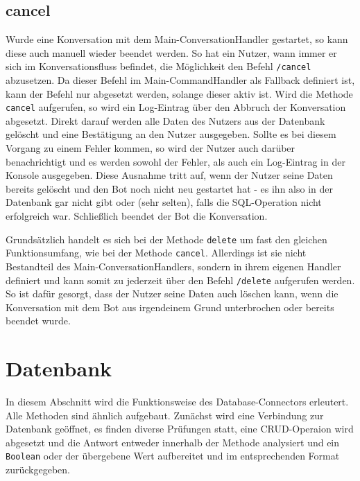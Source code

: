         
        \subsection{cancel} \label{Implementierung: cancel.py}
                Wurde eine Konversation mit dem Main-ConversationHandler gestartet, so kann diese auch manuell wieder beendet werden. So hat ein Nutzer, wann immer er sich im Konversationsfluss befindet, die Möglichkeit den Befehl \verb|/cancel| abzusetzen. Da dieser Befehl im Main-CommandHandler als Fallback definiert ist, kann der Befehl nur abgesetzt werden, solange dieser aktiv ist. Wird die Methode \verb|cancel| aufgerufen, so wird ein Log-Eintrag über den Abbruch der Konversation abgesetzt. Direkt darauf werden alle Daten des Nutzers aus der Datenbank gelöscht und eine Bestätigung an den Nutzer ausgegeben. Sollte es bei diesem Vorgang zu einem Fehler kommen, so wird der Nutzer auch darüber benachrichtigt und es werden sowohl der Fehler, als auch ein Log-Eintrag in der Konsole ausgegeben. Diese Ausnahme tritt auf, wenn der Nutzer seine Daten bereits gelöscht und den Bot noch nicht neu gestartet hat - es ihn also in der Datenbank gar nicht gibt oder (sehr selten), falls die SQL-Operation nicht erfolgreich war.
                Schließlich beendet der Bot die Konversation.

                Grundsätzlich handelt es sich bei der Methode \verb|delete| um fast den gleichen Funktionsumfang, wie bei der Methode \verb|cancel|. Allerdings ist sie nicht Bestandteil des Main-ConversationHandlers, sondern in ihrem eigenen Handler definiert und kann somit zu jederzeit über den Befehl \verb|/delete| aufgerufen werden. So ist dafür gesorgt, dass der Nutzer seine Daten auch löschen kann, wenn die Konversation mit dem Bot aus irgendeinem Grund unterbrochen oder bereits beendet wurde.


    \section{Datenbank} \label{Implementierung: Datenbank}

        In diesem Abschnitt wird die Funktionsweise des Database-Connectors erleutert. Alle Methoden sind ähnlich aufgebaut. Zunächst wird eine Verbindung zur Datenbank geöffnet, es finden diverse Prüfungen statt, eine CRUD-Operaion wird abgesetzt und die Antwort entweder innerhalb der Methode analysiert und ein \verb|Boolean| oder der übergebene Wert aufbereitet und im entsprechenden Format zurückgegeben.
                
